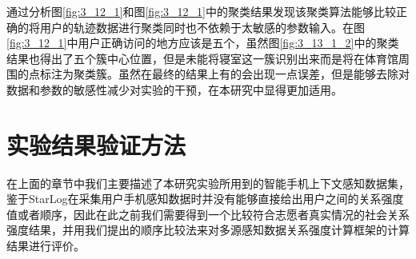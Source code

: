 \par 通过分析图\ref{fig:3_12_1}和图\ref{fig:3_12_1}中的聚类结果发现该聚类算法能够比较正确的将用户的轨迹数据进行聚类同时也不依赖于太敏感的参数输入。在图\ref{fig:3_12_1}中用户正确访问的地方应该是五个，虽然图\ref{fig:3_13_1_2}中的聚类结果也得出了五个簇中心位置，但是未能将寝室这一簇识别出来而是将在体育馆周围的点标注为聚类簇。虽然在最终的结果上有的会出现一点误差，但是能够去除对数据和参数的敏感性减少对实验的干预，在本研究中显得更加适用。


\section{实验结果验证方法}
\label{sec:section5-2}
在上面的章节中我们主要描述了本研究实验所用到的智能手机上下文感知数据集，鉴于StarLog在采集用户手机感知数据时并没有能够直接给出用户之间的关系强度值或者顺序，因此在此之前我们需要得到一个比较符合志愿者真实情况的社会关系强度结果，并用我们提出的顺序比较法来对多源感知数据关系强度计算框架的计算结果进行评价。
